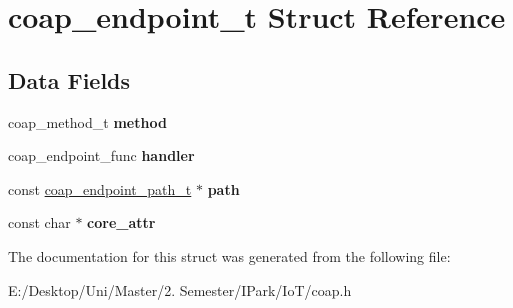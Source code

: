 \hypertarget{structcoap__endpoint__t}{}\section{coap\+\_\+endpoint\+\_\+t Struct Reference}
\label{structcoap__endpoint__t}
\subsection*{Data Fields}
\begin{DoxyCompactItemize}
\item 
\mbox{\label{structcoap__endpoint__t_a3d1c707094fced3ec21fd0b483ec8afa}} 
coap\+\_\+method\+\_\+t {\bfseries method}
\item 
\mbox{\label{structcoap__endpoint__t_a29487ba824e9b2aa12ddebf53b990465}} 
coap\+\_\+endpoint\+\_\+func {\bfseries handler}
\item 
\mbox{\label{structcoap__endpoint__t_a73664eb2d0ca79edf465c2aa37a592bc}} 
const \hyperlink{structcoap__endpoint__path__t}{coap\+\_\+endpoint\+\_\+path\+\_\+t} $\ast$ {\bfseries path}
\item 
\mbox{\label{structcoap__endpoint__t_a3e896b10173fb51da72b188a43126291}} 
const char $\ast$ {\bfseries core\+\_\+attr}
\end{DoxyCompactItemize}


The documentation for this struct was generated from the following file\+:\begin{DoxyCompactItemize}
\item 
E\+:/\+Desktop/\+Uni/\+Master/2. Semester/\+I\+Park/\+Io\+T/coap.\+h\end{DoxyCompactItemize}
